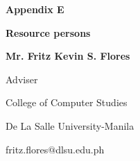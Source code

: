 %
%
%                 

\textbf{\Huge Appendix E}
\bigskip

\textbf{\LARGE Resource persons}

\bigskip
\textbf{Mr. Fritz Kevin S. Flores}

Adviser

College of Computer Studies

{De La Salle University-Manila}

fritz.flores$@$dlsu.edu.ph

